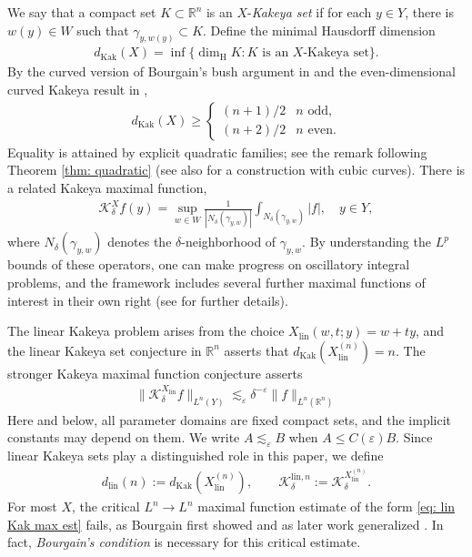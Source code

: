 \documentclass[reqno,11pt]{amsart}
\numberwithin{equation}{section}
\numberwithin{figure}{section}
\def\R{\mathbb{R}}
\def\eps{\varepsilon}
\renewcommand\leq{\leqslant}
\renewcommand\geq{\geqslant}
\theoremstyle{plain}
\theoremstyle{definition}
\newcommand{\Kak}{\mathrm{Kak}}
\newcommand{\lin}{\mathrm{lin}}
\renewcommand{\H}{\mathrm{H}}
\begin{document}
    We say that a compact set $K \subset \R^n$ is an $X$-\emph{Kakeya set} if for each $y \in Y$, there is $w(y) \in W$ such that $\gamma_{y,w(y)} \subset K$.
    Define the minimal Hausdorff dimension 
    \begin{align}
        d_{\Kak}(X) = \inf\{\dim_\H K : \text{$K$ is an $X$-Kakeya set}\}.
    \end{align}
    By the curved version of Bourgain's bush argument in \cite{wisewell} and the even-dimensional curved Kakeya result in \cite{bourgainGuth}, 
    \begin{align}\label{eq: universal bound}
        d_{\Kak}(X) \geq 
        \begin{cases}
            (n+1)/2 & n \text{ odd,}\\
            (n+2)/2 & n \text{ even}.
        \end{cases}
    \end{align}
    Equality is attained by explicit quadratic families; see the remark following Theorem \ref{thm: quadratic} (see also \cite{guthOscillatory} for a construction with cubic curves).
    There is a related Kakeya maximal function,
    \begin{align}
        \mathcal K_{\delta}^{X} f(y) = \sup_{w \in W}\frac{1}{|N_\delta(\gamma_{y,w})|}\int_{N_\delta(\gamma_{y,w})} |f|,  \quad y \in Y,
    \end{align}
    where $N_\delta(\gamma_{y,w})$ denotes the $\delta$-neighborhood of $\gamma_{y,w}$.
    By understanding the $L^p$ bounds of these operators, one can make progress on oscillatory integral problems, and the framework includes several further maximal functions of interest in their own right (see \cite{guo2026curvedkakeyaproblemsprojective} for further details).

    
    The linear Kakeya problem arises from the choice $X_{\lin}(w,t;y) = w + ty$, and the linear Kakeya set conjecture in $\R^n$ asserts that 
    $d_\Kak(X_{\lin}^{(n)}) = n$. The stronger Kakeya maximal function conjecture asserts 
    \begin{align}\label{eq: lin Kak max est}
        \|\mathcal K_\delta^{X_{\lin}} f\|_{L^n(Y)} \lesssim_\eps \delta^{-\eps} \| f\|_{L^n(\R^n)}
    \end{align}
    Here and below, all parameter domains are fixed compact sets, and the implicit constants may depend on them. We write $A \lesssim_\eps B$ when $A \leq C(\eps) B$. 
    Since linear Kakeya sets play a distinguished role in this paper, we define 
    \begin{align}
        d_{\lin}(n) := d_{\Kak}(X_{\lin}^{(n)}), \qquad \mathcal K^{\lin, n}_\delta := \mathcal K_{\delta}^{X_{\lin}^{(n)}}.
    \end{align}
    For most $X$, the critical $L^n \to L^n$ maximal function estimate of the form \eqref{eq: lin Kak max est} fails, as Bourgain first showed and as later work generalized \cite{BourgainSeveralVariables, hormanderDichotomy, guo2026curvedkakeyaproblemsprojective}.
    In fact, \emph{Bourgain's condition} is necessary for this critical estimate. 
\end{document}
